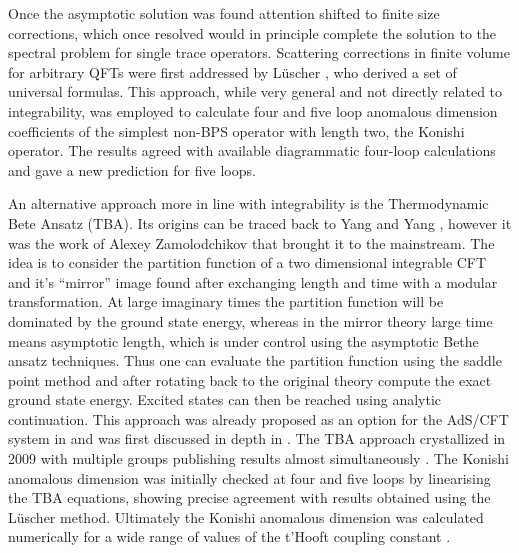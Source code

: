 Once the asymptotic solution was found attention shifted to finite size corrections, which once resolved would in principle complete the solution to the spectral problem for single trace operators. 
Scattering corrections in finite volume for arbitrary QFTs were first addressed by L\"{u}scher \cite{Luscher:1986}, who derived a set of universal formulas. 
This approach, while very general and not directly related to integrability, was employed to calculate four \cite{Bajnok:2008bm} and five loop anomalous dimension coefficients \cite{Bajnok:2009vm} of the simplest non-BPS operator with length two, the Konishi operator.
The results agreed with available diagrammatic four-loop calculations \cite{Fiamberti:2007rj} and gave a new prediction for five loops.

An alternative approach more in line with integrability is the Thermodynamic Bete Ansatz (TBA).
Its origins can be traced back to Yang and Yang \cite{Yang}, however it was the work of Alexey Zamolodchikov \cite{Zamolodchikov1, Zamolodchikov2} that brought it to the mainstream. 
The idea is to consider the partition function of a two dimensional integrable CFT and it's ``mirror'' image found after exchanging length and time with a modular transformation.
At large imaginary times the partition function will be dominated by the ground state energy, whereas in the mirror theory large time means asymptotic length, which is under control using the asymptotic Bethe ansatz techniques.
Thus one can evaluate the partition function using the saddle point method and after rotating back to the original theory compute the exact ground state energy. 
Excited states can then be reached using analytic continuation. 
This approach was already proposed as an option for the AdS/CFT system in \cite{Ambjorn:2005wa} and was first discussed in depth in \cite{Arutyunov:2007tc}.
The TBA approach crystallized in 2009 with multiple groups publishing results almost simultaneously \cite{Gromov:2009tv, Bombardelli:2009ns, Gromov:2009bc, Arutyunov:2009ur}.
The Konishi anomalous dimension was initially checked at four \cite{Gromov:2009bc} and five \cite{Arutyunov:2010gb, Balog:2010xa} loops by linearising the TBA equations, showing precise agreement with results obtained using the L\"{u}scher method.
Ultimately the Konishi anomalous dimension was calculated numerically for a wide range of values of the t'Hooft coupling constant \cite{Gromov:2009zb}.

